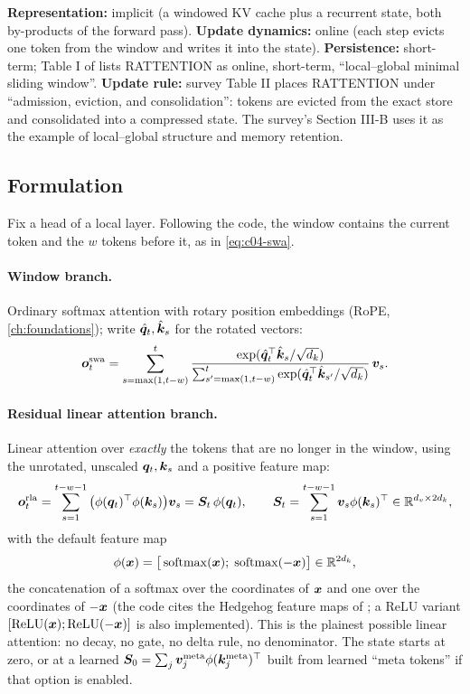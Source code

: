 \begin{taxonomy}
\textbf{Representation:} implicit (a windowed KV cache plus a recurrent state, both by-products
of the forward pass).
\textbf{Update dynamics:} online (each step evicts one token from the window and writes it into
the state).
\textbf{Persistence:} short-term; Table I of \citet{zhoubian2026memory} lists RATTENTION as
online, short-term, ``local--global minimal sliding window''.
\textbf{Update rule:} survey Table II places RATTENTION under ``admission, eviction, and
consolidation'': tokens are evicted from the exact store and consolidated into a compressed state.
The survey's Section III-B uses it as the example of local--global structure and memory retention.
\end{taxonomy}

\subsection{Formulation}

Fix a head of a local layer. Following the code, the window contains the current token and the
$w$ tokens before it, as in \eqref{eq:c04-swa}.

\paragraph{Window branch.} Ordinary softmax attention with rotary position embeddings (RoPE,
\cref{ch:foundations}); write $\hat{\bm{q}}_t,\hat{\bm{k}}_s$ for the rotated vectors:
\begin{equation}\label{eq:c04-ratt-swa}
  \bm{o}^{\mathrm{swa}}_t=\sum_{s=\max(1,t-w)}^{t}
  \frac{\exp(\hat{\bm{q}}_t^{\top}\hat{\bm{k}}_s/\sqrt{d_k})}{\sum_{s'=\max(1,t-w)}^{t}\exp(\hat{\bm{q}}_t^{\top}\hat{\bm{k}}_{s'}/\sqrt{d_k})}\,\bm{v}_s .
\end{equation}

\paragraph{Residual linear attention branch.} Linear attention over \emph{exactly} the tokens that
are no longer in the window, using the unrotated, unscaled $\bm{q}_t,\bm{k}_s$ and a positive feature
map:
\begin{equation}\label{eq:c04-ratt-rla}
  \bm{o}^{\mathrm{rla}}_t=\sum_{s=1}^{t-w-1}\big(\phi(\bm{q}_t)^{\top}\phi(\bm{k}_s)\big)\bm{v}_s=\bm{S}_t\,\phi(\bm{q}_t),
  \qquad \bm{S}_t=\sum_{s=1}^{t-w-1}\bm{v}_s\phi(\bm{k}_s)^{\top}\in\mathbb{R}^{d_v\times 2d_k},
\end{equation}
with the default feature map
\begin{equation}\label{eq:c04-ratt-phi}
  \phi(\bm{x})=\big[\operatorname{softmax}(\bm{x});\;\operatorname{softmax}(-\bm{x})\big]\in\mathbb{R}^{2d_k},
\end{equation}
the concatenation of a softmax over the coordinates of $\bm{x}$ and one over the coordinates of
$-\bm{x}$ (the code cites the Hedgehog feature maps of \citet{c04-zhang2024hedgehog}; a ReLU
variant $[\operatorname{ReLU}(\bm{x});\operatorname{ReLU}(-\bm{x})]$ is also implemented). This is the plainest possible linear
attention: no decay, no gate, no delta rule, no denominator. The state starts at zero, or at a
learned $\bm{S}_0=\sum_{j}\bm{v}^{\mathrm{meta}}_j\phi(\bm{k}^{\mathrm{meta}}_j)^{\top}$ built from learned
``meta tokens'' if that option is enabled.


